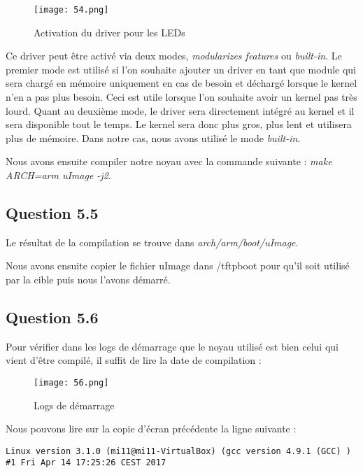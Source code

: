 \documentclass[a4paper,12pt]{report}
\begin{document}
\newpage
\begin{figure}[h]
	\centering
		\texttt{[image: 54.png]}
		\caption{Activation du driver pour les LEDs}
\end{figure}

\newpage

Ce driver peut être activé via deux modes, \textit{modularizes features} ou \textit{built-in}. Le premier mode est utilisé si l'on souhaite ajouter un driver en tant que module qui sera chargé en mémoire uniquement en cas de besoin et déchargé lorsque le kernel n'en a pas plus besoin. Ceci est utile lorsque l'on souhaite avoir un kernel pas très lourd.
Quant au deuxième mode, le driver sera directement intégré au kernel et il sera disponible tout le temps. Le kernel sera donc plus gros, plus lent et utilisera plus de mémoire.
Dans notre cas, nous avons utilisé le mode \textit{built-in}.\newline

Nous avons ensuite compiler notre noyau avec la commande suivante : \textit{make ARCH=arm uImage -j2}.

\newpage

\subsection{Question 5.5}

Le résultat de la compilation se trouve dans \textit{arch/arm/boot/uImage}.

Nous avons ensuite copier le fichier uImage dans /tftpboot pour qu'il soit utilisé par la cible puis nous l'avons démarré.

\subsection{Question 5.6}

Pour vérifier dans les logs de démarrage que le noyau utilisé est bien celui qui vient d'être compilé, il suffit de lire la date de compilation :

\begin{figure}[h]
	\centering
		\texttt{[image: 56.png]}
		\caption{Logs de démarrage}
\end{figure}

Nous pouvons lire sur la copie d'écran précédente la ligne suivante : 
\begin{verbatim}
Linux version 3.1.0 (mi11@mi11-VirtualBox) (gcc version 4.9.1 (GCC) ) 
#1 Fri Apr 14 17:25:26 CEST 2017
\end{verbatim}
\end{document}

